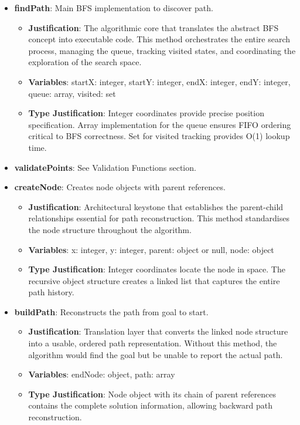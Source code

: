 \begin{itemize}
  \item \textbf{findPath}: Main BFS implementation to discover path.
    \begin{itemize}
      \item \textbf{Justification}: The algorithmic core that translates the abstract BFS concept into executable code. This method orchestrates the entire search process, managing the queue, tracking visited states, and coordinating the exploration of the search space.
      \item \textbf{Variables}: startX: integer, startY: integer, endX: integer, endY: integer, queue: array, visited: set
      \item \textbf{Type Justification}: Integer coordinates provide precise position specification. Array implementation for the queue ensures FIFO ordering critical to BFS correctness. Set for visited tracking provides O(1) lookup time.
    \end{itemize}
    
  \item \textbf{validatePoints}: See Validation Functions section.
  
  \item \textbf{createNode}: Creates node objects with parent references.
    \begin{itemize}
      \item \textbf{Justification}: Architectural keystone that establishes the parent-child relationships essential for path reconstruction. This method standardises the node structure throughout the algorithm.
      \item \textbf{Variables}: x: integer, y: integer, parent: object or null, node: object
      \item \textbf{Type Justification}: Integer coordinates locate the node in space. The recursive object structure creates a linked list that captures the entire path history.
    \end{itemize}
    
  \item \textbf{buildPath}: Reconstructs the path from goal to start.
    \begin{itemize}
      \item \textbf{Justification}: Translation layer that converts the linked node structure into a usable, ordered path representation. Without this method, the algorithm would find the goal but be unable to report the actual path.
      \item \textbf{Variables}: endNode: object, path: array
      \item \textbf{Type Justification}: Node object with its chain of parent references contains the complete solution information, allowing backward path reconstruction.
    \end{itemize}
    

\end{itemize}
